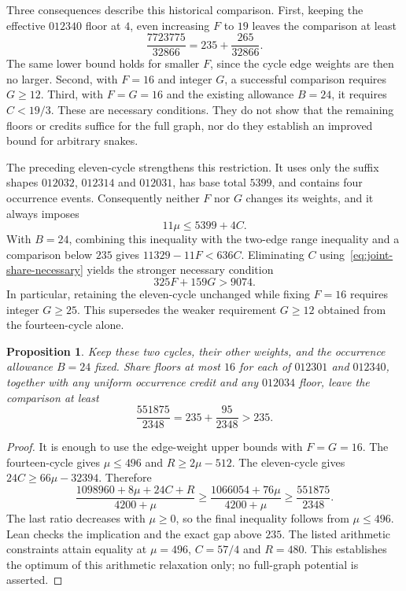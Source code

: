 \documentclass[11pt,a4paper]{article}
\newtheorem{proposition}[theorem]{Proposition}
\theoremstyle{definition}
\theoremstyle{remark}
\begin{document}
Three consequences describe this historical comparison. First, keeping the effective
$012340$ floor at $4$, even increasing $F$ to $19$ leaves the comparison at least
\[
\frac{7723775}{32866}=235+\frac{265}{32866}.
\]
The same lower bound holds for smaller $F$, since the cycle edge weights
are then no larger. Second, with $F=16$ and integer $G$, a successful
comparison requires $G\ge12$. Third, with $F=G=16$ and the existing
allowance $B=24$, it requires $C<19/3$. These are necessary conditions.
They do not show that the remaining floors or credits suffice for the
full graph, nor do they establish an improved bound for arbitrary snakes.

The preceding eleven-cycle strengthens this restriction. It uses only the
suffix shapes $012032$, $012314$ and $012031$, has base total $5399$,
and contains four occurrence events. Consequently neither $F$ nor $G$
changes its weights, and it always imposes
\[
11\mu\le5399+4C.
\]
With $B=24$, combining this inequality with the two-edge range inequality
and a comparison below $235$ gives $11329-11F<636C$. Eliminating $C$
using~\eqref{eq:joint-share-necessary} yields the stronger necessary condition
\begin{equation}\label{eq:two-cycle-share-necessary}
325F+159G>9074.
\end{equation}
In particular, retaining the eleven-cycle unchanged while fixing $F=16$
requires integer $G\ge25$. This supersedes the weaker requirement $G\ge12$
obtained from the fourteen-cycle alone.

\begin{proposition}\label{prop:two-cycle-share16-obstruction}
Keep these two cycles, their other weights, and the occurrence allowance
$B=24$ fixed. Share floors at most $16$ for each of $012301$ and $012340$,
together with any uniform occurrence credit and any $012034$ floor,
leave the comparison at least
\[
\frac{551875}{2348}=235+\frac{95}{2348}>235.
\]
\end{proposition}
\begin{proof}
It is enough to use the edge-weight upper bounds with $F=G=16$.
The fourteen-cycle gives $\mu\le496$ and $R\ge2\mu-512$.
The eleven-cycle gives $24C\ge66\mu-32394$. Therefore
\[
\frac{1098960+8\mu+24C+R}{4200+\mu}
\ge\frac{1066054+76\mu}{4200+\mu}
\ge\frac{551875}{2348}.
\]
The last ratio decreases with $\mu\ge0$, so the final inequality follows
from $\mu\le496$. Lean checks the implication and the exact gap above $235$.
The listed arithmetic constraints attain equality at
$\mu=496$, $C=57/4$ and $R=480$. This establishes the optimum of this
arithmetic relaxation only; no full-graph potential is asserted.
\end{proof}
\end{document}
